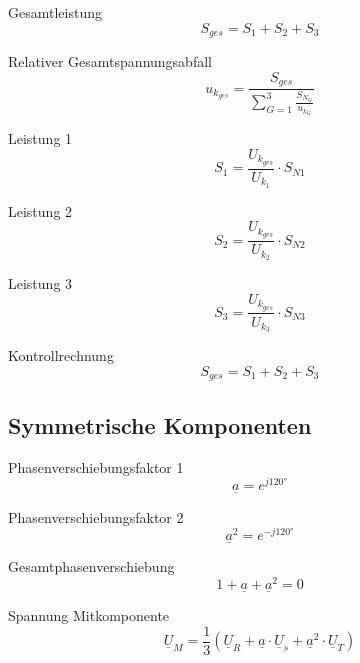 \documentclass[11pt, a4paper, draft, fleqn, twocolumn]{article}
\numberwithin{equation}{subsection}
\begin{document}
\noindent Gesamtleistung
\begin{equation}
    S_{ges} = S_1 + S_2 + S_3
\end{equation}

\noindent Relativer Gesamtspannungsabfall
\begin{equation}
    u_{k_{ges}} = \frac{S_{ges}}{\sum_{G=1}^{3} \frac{S_{N_{G}}}{u_{k_{G}}}}
\end{equation}

\noindent Leistung 1
\begin{equation}
    S_1 = \frac{U_{k_{ges}}}{U_{k_{1}}} \cdot S_{N1}
\end{equation}

\noindent Leistung 2
\begin{equation}
    S_2 = \frac{U_{k_{ges}}}{U_{k_{2}}} \cdot S_{N2}
\end{equation}

\noindent Leistung 3
\begin{equation}
    S_3 = \frac{U_{k_{ges}}}{U_{k_{3}}} \cdot S_{N3}
\end{equation}

\noindent Kontrollrechnung
\begin{equation}
    S_{ges} = S_1 + S_2 + S_3
\end{equation}


\subsection{Symmetrische Komponenten}

Phasenverschiebungsfaktor 1
\begin{equation}
    \underline{a} = e^{j120\text{°}}
\end{equation}

\noindent Phasenverschiebungsfaktor 2
\begin{equation}
    \underline{a}^2 = e^{-j120\text{°}}
\end{equation}

\noindent Gesamtphasenverschiebung
\begin{equation}
    1 + \underline{a} + \underline{a}^2 = 0
\end{equation}

\noindent Spannung Mitkomponente
\begin{equation}
    \underline{U}_M = \frac{1}{3}(\underline{U}_R + \underline{a} \cdot \underline{U}_s + \underline{a}^2 \cdot \underline{U}_T)
\end{equation}
\end{document}
